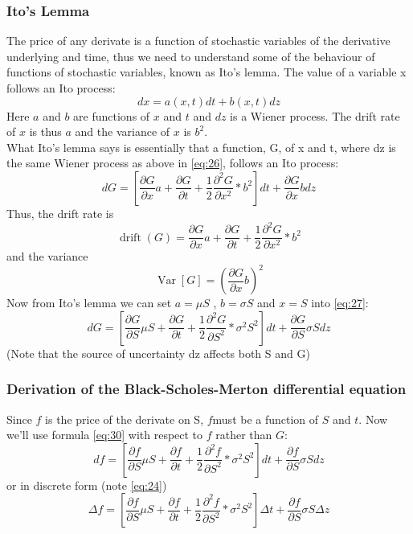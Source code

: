 \documentclass{article}
\DeclareMathOperator{\Var}{Var}
\DeclareMathOperator{\drift}{drift}
\begin{document}
\subsubsection{Ito's Lemma}
The price of any derivate is a function of stochastic variables of the derivative underlying and time, thus we need to understand some of the behaviour of functions of stochastic variables, known as Ito’s lemma. The value of a variable x follows an Ito process:
\begin{equation} \label{eq:26}
    dx = a(x, t) dt + b(x, t) dz
\end{equation}
Here $a$ and $b$ are functions of $x$ and $t$ and $dz$ is a Wiener process. The drift rate of $x$ is thus $a$ and the variance of $x$ is $b^{2}$. \\ [2ex]
What Ito’s lemma says is essentially that a function, G, of x and t, where dz is the same Wiener process as above in \ref{eq:26}, follows an Ito process:
\begin{equation} \label{eq:27}
    dG = \left[\frac{\partial G }{\partial x} a + \frac{\partial G }{\partial t} + \frac{1}{2}\frac{\partial^{2} G }{\partial x^{2}} * b^{2}\right]dt + \frac{\partial G }{\partial x} b dz
\end{equation}
Thus, the drift rate is 
\begin{equation} \label{eq:28}
    \drift(G) = \frac{\partial G }{\partial x} a + \frac{\partial G }{\partial t} + \frac{1}{2}\frac{\partial^{2} G }{\partial x^{2}} * b^{2}
\end{equation}
and the variance
\begin{equation} \label{eq:29}
    \Var[G] = (\frac{\partial G }{\partial x} b)^{2}
\end{equation}
Now from Ito’s lemma we can set $a = \mu S$ , $b = \sigma S$ and $x = S$ into \ref{eq:27}:
\begin{equation} \label{eq:30}
    dG = \left[\frac{\partial G }{\partial S} \mu S + \frac{\partial G }{\partial t} + \frac{1}{2}\frac{\partial^{2} G }{\partial S^{2}} * \sigma^{2} S^{2}\right]dt + \frac{\partial G }{\partial S} \sigma S dz
\end{equation}
(Note that the source of uncertainty dz affects both S and G)
\subsubsection{Derivation of the Black-Scholes-Merton differential equation}
Since $f$ is the price of the derivate on S, $f$must be a function of $S$ and $t$. Now we’ll use formula \ref{eq:30} with respect to $f$ rather than $G$:
\begin{equation} \label{eq:31}
    df = \left[\frac{\partial f }{\partial S} \mu S + \frac{\partial f }{\partial t} + \frac{1}{2}\frac{\partial^{2} f }{\partial S^{2}} * \sigma^{2} S^{2}\right]dt + \frac{\partial f }{\partial S} \sigma S dz
\end{equation}
or in discrete form (note \ref{eq:24})
\begin{equation} \label{eq:32}
    \Delta f = \left[\frac{\partial f }{\partial S} \mu S + \frac{\partial f }{\partial t} + \frac{1}{2}\frac{\partial^{2} f }{\partial S^{2}} * \sigma^{2} S^{2}\right]\Delta t + \frac{\partial f }{\partial S} \sigma S \Delta z
\end{equation}
\end{document}
